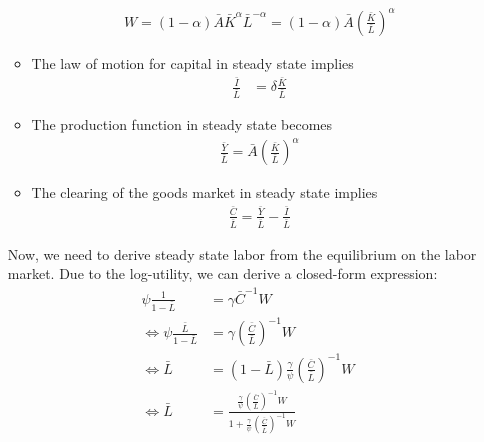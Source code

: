 \documentclass[a4paper]{scrartcl}
\begin{document}
\begin{enumerate}
\begin{solution}
\begin{itemize}
                            \begin{align*}
                                W =(1-\alpha) \bar{A}\bar{K}^\alpha \bar{L}^{-\alpha} = (1-\alpha)\bar{A} \left(\frac{\bar{K}}{\bar{L}}\right)^\alpha
                            \end{align*}
                      \item The law of motion for capital in steady state implies
                            \begin{align*}
                                \frac{\bar{I}}{\bar{L}} & = \delta\frac{\bar{K}}{\bar{L}}
                            \end{align*}
                      \item The production function in steady state becomes
                            \begin{align*}
                                \frac{\bar{Y}}{\bar{L}} = \bar{A} \left(\frac{\bar{K}}{\bar{L}}\right)^\alpha
                            \end{align*}
                      \item The clearing of the goods market in steady state implies
                            \begin{align*}
                                \frac{\bar{C}}{\bar{L}} = \frac{\bar{Y}}{\bar{L}} - \frac{\bar{I}}{\bar{L}}
                            \end{align*}
                  \end{itemize}
                  Now, we need to derive steady state labor from the equilibrium on the labor market. Due to the log-utility, we can derive a closed-form expression:
                  \begin{align*}
                      \psi \frac{1}{1-\bar{L}}                       & = \gamma \bar{C}^{-1} W                                                                                                                     \\
                      \Leftrightarrow \psi \frac{\bar{L}}{1-\bar{L}} & = \gamma \left(\frac{\bar{C}}{\bar{L}}\right)^{-1} W                                                                                        \\
                      \Leftrightarrow \bar{L}                        & = (1-\bar{L})\frac{\gamma}{\psi} \left(\frac{\bar{C}}{\bar{L}}\right)^{-1} W                                                                \\
                      \Leftrightarrow \bar{L}                        & = \frac{\frac{\gamma}{\psi} \left(\frac{\bar{C}}{\bar{L}}\right)^{-1} W}{1+\frac{\gamma}{\psi} \left(\frac{\bar{C}}{\bar{L}}\right)^{-1} W} \\		

\end{align*}
\end{solution}
\end{enumerate}
\end{document}

